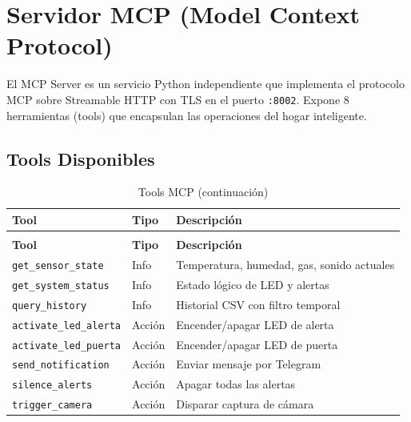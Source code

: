 \documentclass[12pt,letterpaper]{article}
\begin{document}
\newpage

\section{Servidor MCP (Model Context Protocol)}

El MCP Server es un servicio Python independiente que implementa el protocolo MCP sobre Streamable HTTP con TLS en el puerto \mbox{\texttt{:8002}}. Expone 8 herramientas (tools) que encapsulan las operaciones del hogar inteligente.

\subsection{Tools Disponibles}

\small
\setlength{\LTleft}{0pt plus 1fill}
\setlength{\LTright}{0pt plus 1fill}
\begin{longtable}{p{3.5cm}p{2cm}p{7cm}}
    \caption{Tools MCP disponibles para el agente LangGraph.} \\
    \toprule
    \textbf{Tool} & \textbf{Tipo} & \textbf{Descripción} \\
    \midrule
    \endfirsthead
    \caption[]{Tools MCP (continuación)} \\
    \toprule
    \textbf{Tool} & \textbf{Tipo} & \textbf{Descripción} \\
    \midrule
    \endhead
    \bottomrule
    \endfoot
    \mbox{\texttt{get\_sensor\_state}} & Info & Temperatura, humedad, gas, sonido actuales \\
    \mbox{\texttt{get\_system\_status}} & Info & Estado lógico de LED y alertas \\
    \mbox{\texttt{query\_history}} & Info & Historial CSV con filtro temporal \\
    \mbox{\texttt{activate\_led\_alerta}} & Acción & Encender/apagar LED de alerta \\
    \mbox{\texttt{activate\_led\_puerta}} & Acción & Encender/apagar LED de puerta \\
    \mbox{\texttt{send\_notification}} & Acción & Enviar mensaje por Telegram \\
    \mbox{\texttt{silence\_alerts}} & Acción & Apagar todas las alertas \\
    \mbox{\texttt{trigger\_camera}} & Acción & Disparar captura de cámara \\
\end{longtable}
\setlength{\LTleft}{0pt}
\setlength{\LTright}{0pt}
\end{document}
